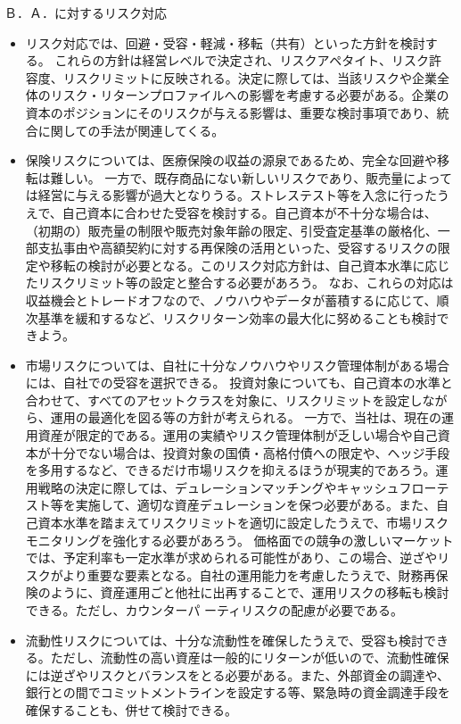 \documentclass[report,gutter=10mm,fore-edge=10mm,uplatex,dvipdfmx]{jlreq}
\begin{document}
Ｂ．Ａ．に対するリスク対応

\begin{itemize}
\item[] リスク対応では、回避・受容・軽減・移転（共有）といった方針を検討する。
これらの方針は経営レベルで決定され、リスクアペタイト、リスク許容度、リスクリミットに反映される。決定に際しては、当該リスクや企業全体のリスク・リターンプロファイルへの影響を考慮する必要がある。企業の資本のポジションにそのリスクが与える影響は、重要な検討事項であり、統合に関しての手法が関連してくる。
\item[] 保険リスクについては、医療保険の収益の源泉であるため、完全な回避や移転は難しい。
一方で、既存商品にない新しいリスクであり、販売量によっては経営に与える影響が過大となりうる。ストレステスト等を入念に行ったうえで、自己資本に合わせた受容を検討する。自己資本が不十分な場合は、（初期の）販売量の制限や販売対象年齢の限定、引受査定基準の厳格化、一部支払事由や高額契約に対する再保険の活用といった、受容するリスクの限定や移転の検討が必要となる。このリスク対応方針は、自己資本水準に応じたリスクリミット等の設定と整合する必要があろう。
なお、これらの対応は収益機会とトレードオフなので、ノウハウやデータが蓄積するに応じて、順次基準を緩和するなど、リスクリターン効率の最大化に努めることも検討できよう。
\item[] 市場リスクについては、自社に十分なノウハウやリスク管理体制がある場合には、自社での受容を選択できる。
投資対象についても、自己資本の水準と合わせて、すべてのアセットクラスを対象に、リスクリミットを設定しながら、運用の最適化を図る等の方針が考えられる。
一方で、当社は、現在の運用資産が限定的である。運用の実績やリスク管理体制が乏しい場合や自己資本が十分でない場合は、投資対象の国債・高格付債への限定や、ヘッジ手段を多用するなど、できるだけ市場リスクを抑えるほうが現実的であろう。運用戦略の決定に際しては、デュレーションマッチングやキャッシュフローテスト等を実施して、適切な資産デュレーションを保つ必要がある。また、自己資本水準を踏まえてリスクリミットを適切に設定したうえで、市場リスクモニタリングを強化する必要があろう。
価格面での競争の激しいマーケットでは、予定利率も一定水準が求められる可能性があり、この場合、逆ざやリスクがより重要な要素となる。自社の運用能力を考慮したうえで、財務再保険のように、資産運用ごと他社に出再することで、運用リスクの移転も検討できる。ただし、カウンターパ
ーティリスクの配慮が必要である。
\item[] 流動性リスクについては、十分な流動性を確保したうえで、受容も検討できる。ただし、流動性の高い資産は一般的にリターンが低いので、流動性確保には逆ざやリスクとバランスをとる必要がある。また、外部資金の調達や、銀行との間でコミットメントラインを設定する等、緊急時の資金調達手段を確保することも、併せて検討できる。

\end{itemize}
\end{document}
